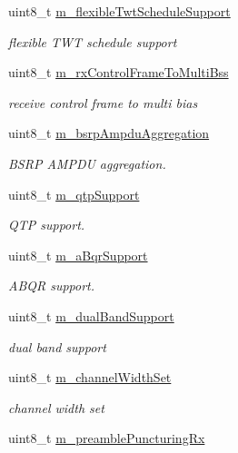 \begin{DoxyCompactItemize}
uint8\+\_\+t \hyperlink{classns3_1_1HeCapabilities_a8add163cd530a5df3c6bafd0e92cb9db}{m\+\_\+flexible\+Twt\+Schedule\+Support}
\begin{DoxyCompactList}\small\item\em flexible T\+WT schedule support \end{DoxyCompactList}\item 
uint8\+\_\+t \hyperlink{classns3_1_1HeCapabilities_a0cf731328abb02e55a281add6e05a6b8}{m\+\_\+rx\+Control\+Frame\+To\+Multi\+Bss}
\begin{DoxyCompactList}\small\item\em receive control frame to multi bias \end{DoxyCompactList}\item 
uint8\+\_\+t \hyperlink{classns3_1_1HeCapabilities_a8d3e6a7eb38f1e4d97b06feb5f16c114}{m\+\_\+bsrp\+Ampdu\+Aggregation}
\begin{DoxyCompactList}\small\item\em B\+S\+RP A\+M\+P\+DU aggregation. \end{DoxyCompactList}\item 
uint8\+\_\+t \hyperlink{classns3_1_1HeCapabilities_a268e8e63f787d19048635296251f9897}{m\+\_\+qtp\+Support}
\begin{DoxyCompactList}\small\item\em Q\+TP support. \end{DoxyCompactList}\item 
uint8\+\_\+t \hyperlink{classns3_1_1HeCapabilities_a1567eb654d5cbfbf223638e15c7516fe}{m\+\_\+a\+Bqr\+Support}
\begin{DoxyCompactList}\small\item\em A\+B\+QR support. \end{DoxyCompactList}\item 
uint8\+\_\+t \hyperlink{classns3_1_1HeCapabilities_a04f73bb72b43ddef5fb488852125bdb2}{m\+\_\+dual\+Band\+Support}
\begin{DoxyCompactList}\small\item\em dual band support \end{DoxyCompactList}\item 
uint8\+\_\+t \hyperlink{classns3_1_1HeCapabilities_aa797e3d4f18880c949ef9d3a85077edf}{m\+\_\+channel\+Width\+Set}
\begin{DoxyCompactList}\small\item\em channel width set \end{DoxyCompactList}\item 
uint8\+\_\+t \hyperlink{classns3_1_1HeCapabilities_ad180538f4dd3e4c2b1e8aadf36a0075c}{m\+\_\+preamble\+Puncturing\+Rx}

\end{DoxyCompactItemize}
